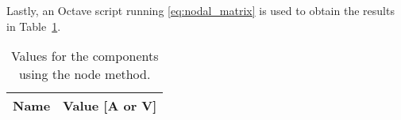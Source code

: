 Lastly, an Octave script running \ref{eq:nodal_matrix} is used to obtain the results in Table~\ref{tab:op3}.


\begin{table}[h]
  \centering
  \begin{tabular}{|l|r|}
    \hline    
    {\bf Name} & {\bf Value [A or V]} \\ \hline
    
  \end{tabular}
  \caption{Values for the components using the node method.}
  \label{tab:op3}
\end{table}





